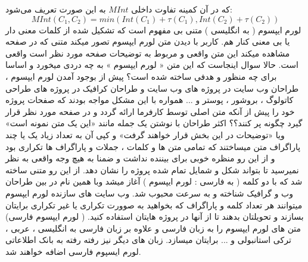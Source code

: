  که در آن کمینه تفاوت داخلی $MInt$ به این صورت تعریف می‌شود‌: 
 \begin{equation}
 MInt(C_1, C_2) = min (Int(C_1) + \tau (C_1), Int(C_2) + \tau (C_2))
 \end{equation}
لورم ایپسوم ( به انگلیسی  ) متنی بی مفهوم است که تشکیل شده از کلمات معنی دار یا بی معنی کنار هم. کاربر با دیدن متن لورم ایپسوم تصور میکند متنی که در صفحه مشاهده میکند این متن واقعی و مربوط به توضیحات صفحه مورد نظر است واقعی است. حالا سوال اینجاست که این متن « لورم ایپسوم » به چه دردی میخورد و اساسا برای چه منظور و هدفی ساخته شده است؟ پیش از بوجود آمدن لورم ایپسوم ، طراحان وب سایت در پروژه های وب سایت و طراحان کرافیک در پروژه های طراحی کاتولوگ ، بروشور ، پوستر و ... همواره با این مشکل مواجه بودند که صفحات پروژه خود را پیش از آنکه متن اصلی توسط کارفرما ارائه گردد و در صفحه مورد نظر قرار گیرد چگونه پر کنند؟؟ اکثر طراحان با نوشتن یک جمله مانند «این یک متن نمونه است» ویا «توضیحات در این بخش قرار خواهند گرفت» و کپی آن به تعداد زیاد یک یا چند پاراگراف متن میساختند که تمامی متن ها و کلمات ، جملات و پاراگراف ها تکراری بود و از این رو منظره خوبی برای بیننده نداشت و ضمنا به هیچ وجه واقعی به نظر نمیرسید تا بتواند شکل و شمایل تمام شده پروژه را نشان دهد. از این رو متنی ساخته شد که با دو کلمه ( به فارسی : لورم ایپسوم ) آغاز میشد وبا همین نام در بین طراحان وب و گرافیک شناخته و به سرعت محبوب شد. وب سایت های سازنده لورم ایپسوم میتوانند هر تعداد کلمه و پاراگراف که بخواهید به صوورت تکراری یا غیر تکراری برایتان بسازند و تحویلتان بدهند تا از آنها در پروژه هایتان استفاده کنید. ( لورم ایپسوم فارسی) متن های لورم ایپسوم را به زبان فارسی و علاوه بر زبان فارسی به انگلیسی ، عربی ، ترکی استانبولی و ... برایتان میسازد. زبان های دیگر نیز رفته رفته به بانک اطلاعاتی لورم ایسپوم فارسی اضافه خواهند شد.  

